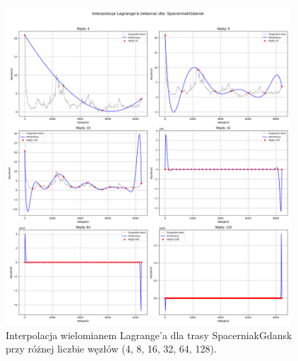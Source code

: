 \documentclass[11pt,a4paper]{article}
\begin{document}
\begin{figure}[H]
    \centering
    \includegraphics[width=0.95\textwidth]{SpacerniakGdansk_Lagrange_basic_subplots.png} %
    \caption{Interpolacja wielomianem Lagrange'a dla trasy SpacerniakGdansk przy różnej liczbie węzłów (4, 8, 16, 32, 64, 128).}
    \label{fig:lagrange_spacerniak}
\end{figure}
\end{document}
